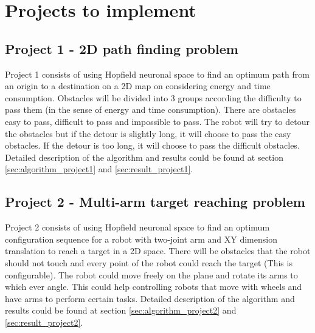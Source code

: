 \section{Projects to implement}
\label{sec:projects}

\subsection{Project 1 - 2D path finding problem}
\label{ssec:project1}

Project 1 consists of using Hopfield neuronal space to find an optimum path from an origin to a destination on a 2D map
on considering energy and time consumption.
Obstacles will be divided into 3 groups according the difficulty to pass them (in the sense of energy and time consumption).
There are obstacles easy to pass, difficult to pass and impossible to pass.
The robot will try to detour the obstacles but if the detour is slightly long, it will choose to pass the easy obstacles.
If the detour is too long, it will choose to pass the difficult obstacles.
Detailed description of the algorithm and results could be found at section \ref{sec:algorithm_project1} and
\ref{sec:result_project1}.


\subsection{Project 2 - Multi-arm target reaching problem}
\label{ssec:project2}

Project 2 consists of using Hopfield neuronal space to find an optimum configuration sequence for a robot
with two-joint arm and XY dimension translation to reach a target in a 2D space.
There will be obstacles that the robot should not touch and every point of the robot could reach the target
(This is configurable).
The robot could move freely on the plane and rotate its arms to which ever angle.
This could help controlling robots that move with wheels and have arms to perform certain tasks.
Detailed description of the algorithm and results could be found at section \ref{sec:algorithm_project2} and
\ref{sec:result_project2}.
